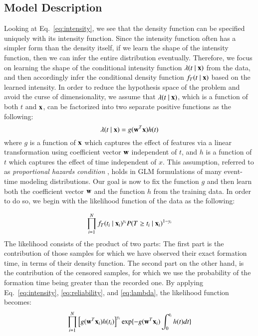 
\subsection{Model Description}
Looking at Eq.~\ref{eq:intensity}, we see that the density function can be specified uniquely with its intensity function. Since the intensity function often has a simpler form than the density itself, if we learn the shape of the intensity function, then we can infer the entire distribution eventually. Therefore, we focus on learning the shape of the conditional intensity function $\lambda(t\mid \mathbf{x})$ from the data, and then accordingly infer the conditional density function $f_T(t\mid \mathbf{x})$ based on the learned intensity.
In order to reduce the hypothesis space of the problem and avoid the curse of dimensionality, we assume that $\lambda(t\mid \mathbf{x})$, which is a function of both $t$ and $\mathbf{x}$, can be factorized into two separate positive functions as the following:
\begin{equation}\label{eq:lambda}
\lambda(t\mid \mb{x})=g(\mb{w}^T\mb{x})h(t)
\end{equation}
where $g$ is a function of $\mathbf{x}$ which captures the effect of features via a linear transformation using coefficient vector $\mathbf{w}$ independent of $t$, and $h$ is a function of $t$ which captures the effect of time independent of $x$. This assumption, referred to as \emph{proportional hazards condition} \cite{breslow1975analysis}, holds in GLM formulations of many event-time modeling distributions. Our goal is now to fix the function $g$ and then learn both the coefficient vector $\mathbf{w}$ and the function $h$ from the training data. In order to do so, we begin with the likelihood function of the data as the following:

\begin{equation}
\prod_{i=1}^{N}f_T(t_i\mid \mathbf{x}_i)^{y_i}P(T\ge t_i\mid \mathbf{x}_i)^{1-y_i}\\
\end{equation}
The likelihood consists of the product of two parts: The first part is the contribution of those samples for which we have observed their exact formation time, in terms of their density function. The second part on the other hand, is the contribution of the censored samples, for which we use the probability of the formation time being greater than the recorded one. By applying Eq.~\ref{eq:intensity}, \ref{eq:reliability}, and \ref{eq:lambda}, the likelihood function becomes:
\begin{equation}
\prod_{i=1}^{N}\left[g(\mathbf{w}^T\mathbf{x}_i)h(t_i)\right]^{y_i}\exp\lbrace-g(\mathbf{w}^T\mathbf{x}_i)\int_{0}^{t_i}h(t)dt\rbrace
\end{equation}

